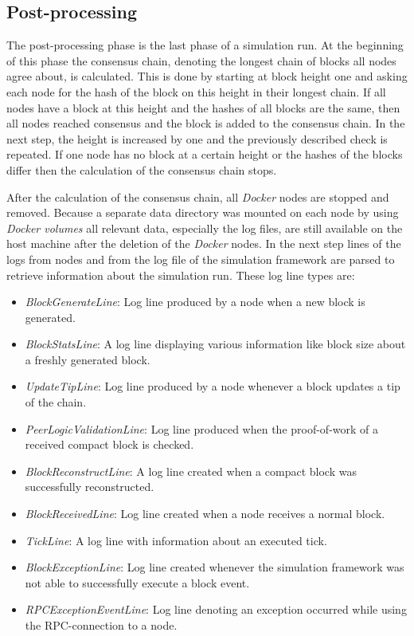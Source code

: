 \subsection{Post-processing}

The post-processing phase is the last phase of a simulation run.
At the beginning of this phase the consensus chain, denoting the longest chain of blocks all nodes agree about, is calculated.
This is done by starting at block height one and asking each node for the hash of the block on this height in their longest chain.
If all nodes have a block at this height and the hashes of all blocks are the same, then all nodes reached consensus and the block is added to the consensus chain.
In the next step, the height is increased by one and the previously described check is repeated.
If one node has no block at a certain height or the hashes of the blocks differ then the calculation of the consensus chain stops.

After the calculation of the consensus chain, all \textit{Docker} nodes are stopped and removed.
Because a separate data directory was mounted on each node by using \textit{Docker volumes} all relevant data, especially the log files, are still available on the host machine after the deletion of the \textit{Docker} nodes.
In the next step lines of the logs from nodes and from the log file of the simulation framework are parsed to retrieve information about the simulation run.
These log line types are:

\begin{itemize}
   \item \textit{BlockGenerateLine}: Log line produced by a node when a new block is generated.
   \item \textit{BlockStatsLine}: A log line displaying various information like block size about a freshly generated block.
   \item \textit{UpdateTipLine}: Log line produced by a node whenever a block updates a tip of the chain.
   \item \textit{PeerLogicValidationLine}: Log line produced when the proof-of-work of a received compact block is checked.  
   \item \textit{BlockReconstructLine}: A log line created when a compact block was successfully reconstructed.
   \item \textit{BlockReceivedLine}: Log line created when a node receives a normal block.
   \item \textit{TickLine}: A log line with information about an executed tick.
   \item \textit{BlockExceptionLine}: Log line created whenever the simulation framework was not able to successfully execute a block event.
   \item \textit{RPCExceptionEventLine}: Log line denoting an exception occurred while using the RPC-connection to a node.
\end{itemize}

